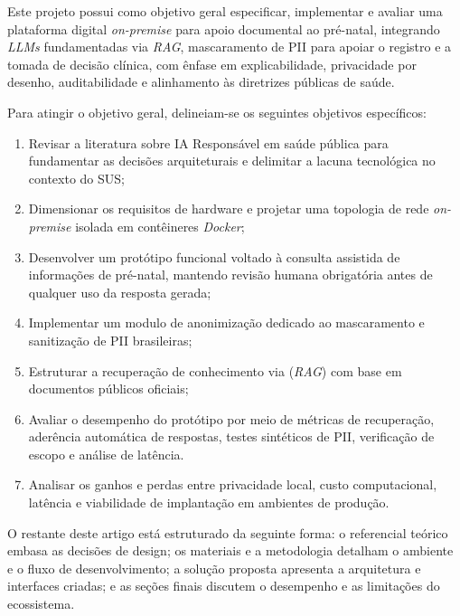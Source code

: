 \documentclass[12pt]{article}
\begin{document}

Este projeto possui como objetivo geral especificar, implementar e avaliar uma plataforma digital \textit{on-premise} para apoio documental ao pré-natal, integrando \textit{LLMs} fundamentadas via \textit{RAG}, mascaramento de PII para apoiar o registro e a tomada de decisão clínica, com ênfase em explicabilidade, privacidade por desenho, auditabilidade e alinhamento às diretrizes públicas de saúde.


Para atingir o objetivo geral, delineiam-se os seguintes objetivos específicos:

\begin{enumerate}
  \item Revisar a literatura sobre IA Responsável em saúde pública para fundamentar as decisões arquiteturais e delimitar a lacuna tecnológica no contexto do SUS;
  \item Dimensionar os requisitos de hardware e projetar uma topologia de rede \textit{on-premise} isolada em contêineres \textit{Docker};
  \item Desenvolver um protótipo funcional voltado à consulta assistida de informações de pré-natal, mantendo revisão humana obrigatória antes de qualquer uso da resposta gerada;
  \item Implementar um modulo de anonimização dedicado ao mascaramento e sanitização de PII brasileiras;
  \item Estruturar a recuperação de conhecimento via (\textit{RAG}) com base em documentos públicos oficiais;
  \item Avaliar o desempenho do protótipo por meio de métricas de recuperação, aderência automática de respostas, testes sintéticos de PII, verificação de escopo e análise de latência.
  \item Analisar os ganhos e perdas entre privacidade local, custo computacional, latência e viabilidade de implantação em ambientes de produção.
\end{enumerate}

O restante deste artigo está estruturado da seguinte forma: o referencial teórico embasa as decisões de design; os materiais e a metodologia detalham o ambiente e o fluxo de desenvolvimento; a solução proposta apresenta a arquitetura e interfaces criadas; e as seções finais discutem o desempenho e as limitações do ecossistema.

\end{document}
